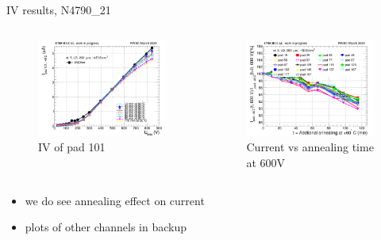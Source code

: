 \documentclass{beamer}
\begin{document}
\begin{frame}{IV results, N4790\_21}
   \begin{columns}
        \begin{figure}
            \includegraphics[width=1.0\textwidth]{plots/annealing_IV_ch101_N4790_21.png}
            \caption{IV of pad 101}
        \end{figure}

        \begin{figure}
            \includegraphics[width=1.0\textwidth]{plots/annealing_current_N4790_21.png}
            \caption{Current vs annealing time at 600V}
        \end{figure}
    \end{columns}
    \begin{itemize}
        \item we do see annealing effect on current
        \item plots of other channels in backup
    \end{itemize}
\end{frame}
\end{document}

